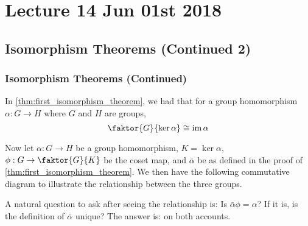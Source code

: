 \chapter{Lecture 14 Jun 01st 2018}%
\label{chp:lecture_14_jun_01st_2018}

\section{Isomorphism Theorems (Continued 2)}%
\label{sec:isomorphism_theorems_continued_2}

\subsection{Isomorphism Theorems (Continued)}%
\label{sub:isomorphism_theorems_continued}

\begin{note}[Recall]
  In \autoref{thm:first_isomorphism_theorem}, we had that for a group homomorphism $\alpha : G \to H$ where $G$ and $H$ are groups,
  \begin{equation*}
    \faktor{G}{\ker \alpha} \cong \img \alpha
  \end{equation*}

  Now let $\alpha : G \to H$ be a group homomorphism, $K = \ker \alpha$, $\phi : G \to \faktor{G}{K}$ be the coset map, and $\bar{\alpha}$ be as defined in the proof of \autoref{thm:first_isomorphism_theorem}. We then have the following commutative diagram to illustrate the relationship between the three groups.
  \begin{center}
  \end{center}
\end{note}

A natural question to ask after seeing the relationship is: Is $\bar{\alpha} \phi = \alpha$? If it is, is the definition of $\bar{\alpha}$ unique? The answer is:  on both accounts.

